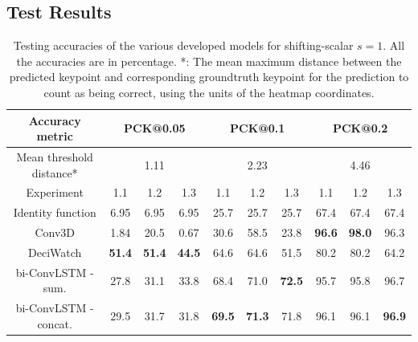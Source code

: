 \documentclass[./main.tex]{subfiles}
\begin{document}
\subsection{Test Results}
\label{subsec:pretrain_test_res}
\begin{table}[htbp]
    \begin{tabular}{c||ccc|ccc|ccc}
        \hline
        Accuracy metric & \multicolumn{3}{c}{PCK@0.05} & \multicolumn{3}{c}{PCK@0.1} & \multicolumn{3}{c}{PCK@0.2} \\
        \hline
        Mean threshold distance* & \multicolumn{3}{c}{1.11} & \multicolumn{3}{c}{2.23} & \multicolumn{3}{c}{4.46} \\
        \hline
        Experiment & 1.1 & 1.2 & 1.3 & 1.1 & 1.2 & 1.3 & 1.1 & 1.2 & 1.3 \\
        \hline
        \hline
        Identity function & 6.95 & 6.95 & 6.95 & 25.7 & 25.7 & 25.7 & 67.4 & 67.4 & 67.4 \\
        Conv3D & 1.84 & 20.5 & 0.67 & 30.6 & 58.5 & 23.8 & \textbf{96.6} & \textbf{98.0} & 96.3 \\
        DeciWatch & \textbf{51.4} & \textbf{51.4} & \textbf{44.5} & 64.6 & 64.6 & 51.5 & 80.2 & 80.2 & 64.2 \\
        bi-ConvLSTM - sum. & 27.8 & 31.1 & 33.8 & 68.4 & 71.0 & \textbf{72.5} & 95.7 & 95.8 & 96.7\\
        bi-ConvLSTM - concat. & 29.5 & 31.7 & 31.8 & \textbf{69.5} & \textbf{71.3} & 71.8 & 96.1 & 96.1 & \textbf{96.9} \\
        \hline
    \end{tabular}
    \caption{Testing accuracies of the various developed models for shifting-scalar $s = 1$. All the accuracies are in percentage. *: The mean maximum distance between the predicted keypoint and corresponding groundtruth keypoint for the prediction to count as being correct, using the units of the heatmap coordinates.}
    \label{tab:pretrain_test_accs_1}
\end{table}
\end{document}
